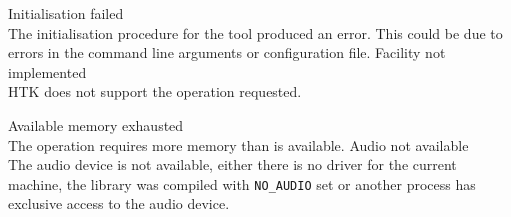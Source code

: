 \begin{itemize}
 Initialisation failed \\
        The initialisation procedure for the tool produced an
        error. This could be due to errors in the command line
        arguments or configuration file.
 Facility not implemented \\
        HTK does not support the operation requested.

 Available memory exhausted \\
        The operation requires more memory than is available.
 Audio not available \\
        The audio device is not available, either there is no driver for
        the current machine, the library was compiled with \texttt{NO\_AUDIO}
        set or another process has exclusive access to the audio device.


\end{itemize}
